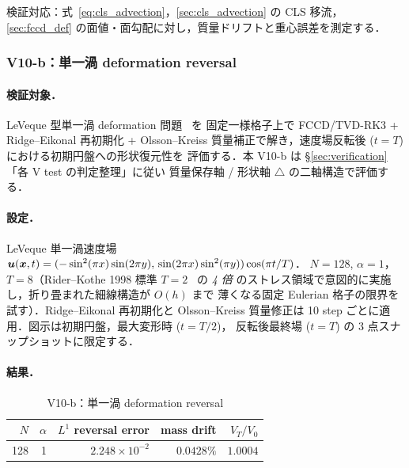 検証対応：式~\eqref{eq:cls_advection}，\autoref{sec:cls_advection} の CLS 移流，
\autoref{sec:fccd_def} の面値・面勾配に対し，質量ドリフトと重心誤差を測定する．

\FloatBarrier

\subsubsection{V10-b：単一渦 deformation reversal}
\label{sec:single_vortex_reversal}

\paragraph{検証対象．}
LeVeque 型単一渦 deformation 問題~\cite{LeVeque1996,RiderKothe1998} を
固定一様格子上で FCCD/TVD-RK3 + Ridge--Eikonal 再初期化 + Olsson--Kreiss
質量補正で解き，速度場反転後 ($t=T$) における初期円盤への形状復元性を
評価する．本 V10-b は §\ref{sec:verification}「各 V test の判定整理」に従い
質量保存軸 \checkmark / 形状軸 $\triangle$ の二軸構造で評価する．

\paragraph{設定．}
LeVeque 単一渦速度場 $\bm{u}(\bm{x}, t) = (-\sin^2(\pi x)\sin(2\pi y),\,
\sin(2\pi x)\sin^2(\pi y)) \cos(\pi t/T)$．
$N=128$, $\alpha=1$，$T=8$（Rider--Kothe 1998 標準 $T=2$~\cite{RiderKothe1998,LeVeque1996}
の \emph{4 倍} のストレス領域で意図的に実施し，折り畳まれた細線構造が $O(h)$ まで
薄くなる固定 Eulerian 格子の限界を試す）．Ridge--Eikonal 再初期化と
Olsson--Kreiss 質量修正は 10 step ごとに適用．図示は初期円盤，最大変形時 ($t=T/2$)，
反転後最終場 ($t=T$) の 3 点スナップショットに限定する．

\paragraph{結果．}
\begin{table}[!htbp]
\caption{V10-b：単一渦 deformation reversal}
\label{tab:V10_single_vortex}
\centering\small
\begin{tabular}{r r r r r}
\toprule
$N$ & $\alpha$ & $L^1$ reversal error & mass drift & $V_T/V_0$ \\
\midrule
128 & 1 & $2.248\times 10^{-2}$ & $0.0428\%$ & $1.0004$ \\
\bottomrule
\end{tabular}
\end{table}

